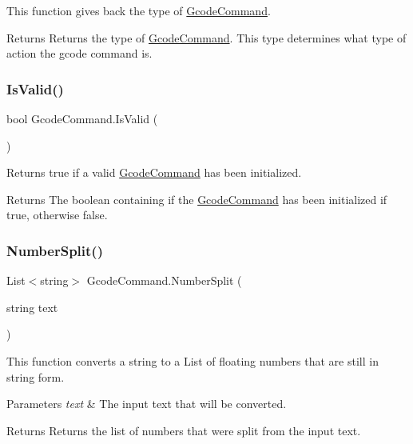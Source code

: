 This function gives back the type of \hyperlink{class_gcode_command}{Gcode\+Command}. 

\begin{DoxyReturn}{Returns}
Returns the type of \hyperlink{class_gcode_command}{Gcode\+Command}. This type determines what type of action the gcode command is.
\end{DoxyReturn}
\mbox{\label{class_gcode_command_a21ddb89f360e9a2497855064cda0672a}} 
\subsubsection{\texorpdfstring{Is\+Valid()}{IsValid()}}
{\footnotesize\ttfamily bool Gcode\+Command.\+Is\+Valid (\begin{DoxyParamCaption}{ }\end{DoxyParamCaption})}



Returns true if a valid \hyperlink{class_gcode_command}{Gcode\+Command} has been initialized. 

\begin{DoxyReturn}{Returns}
The boolean containing if the \hyperlink{class_gcode_command}{Gcode\+Command} has been initialized if true, otherwise false.
\end{DoxyReturn}
\mbox{\label{class_gcode_command_a39d602bf1f22666bc0dd2431b15214ed}} 
\subsubsection{\texorpdfstring{Number\+Split()}{NumberSplit()}}
{\footnotesize\ttfamily List$<$string$>$ Gcode\+Command.\+Number\+Split (\begin{DoxyParamCaption}\item[{string}]{text }\end{DoxyParamCaption})\hspace{0.3cm}{\ttfamily [private]}}



This function converts a string to a List of floating numbers that are still in string form. 


\begin{DoxyParams}{Parameters}
{\em text} & The input text that will be converted.\\
\hline
\end{DoxyParams}
\begin{DoxyReturn}{Returns}
Returns the list of numbers that were split from the input text.
\end{DoxyReturn}
\mbox{\label{class_gcode_command_a7e60f42effcf4a0053d812e16ffa3895}} 

